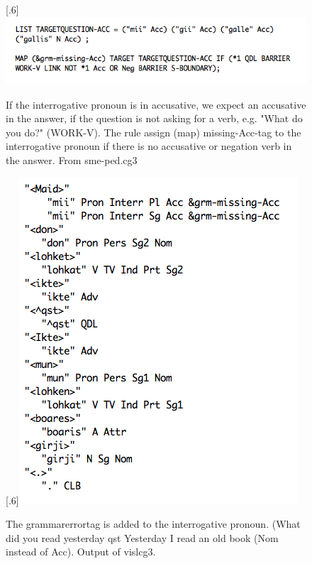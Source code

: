\documentclass[a4paper,12pt]{article}
\begin{document}
\begin{figure}[htbp]
\begin{center}
\scalebox{.6}[.6]{\includegraphics{img/pedcg3.png}}
\caption{If the interrogative pronoun is in accusative, we expect an accusative in the answer, if the question is not asking for a verb, e.g. "What do you do?" (WORK-V). The rule assign (map) missing-Acc-tag to the interrogative pronoun if there is no accusative or negation verb in the answer. From sme-ped.cg3}
\label{cg3}
\end{center}
\end{figure}

\begin{figure}[htbp]
\begin{center}
\scalebox{.6}[.6]{\includegraphics{img/maid_lohket_ikte.png}}
\caption{The grammarerrortag is added to the interrogative pronoun. (What did you read yesterday qst Yesterday I read an old book (Nom instead of Acc). Output of vislcg3.}
\label{maidlohket}
\end{center}
\end{figure}
\end{document}

